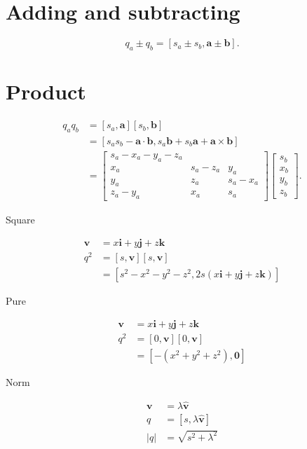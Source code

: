 \documentclass[10pt]{article}
\begin{document}
\section{Adding and subtracting}
$$
q_{a} \pm q_{b}=\left[s_{a} \pm s_{b}, \mathbf{a} \pm \mathbf{b}\right] .
$$

\section{Product}
$$
\begin{aligned}
q_{a} q_{b} & =\left[s_{a}, \mathbf{a}\right]\left[s_{b}, \mathbf{b}\right] \\
& =\left[s_{a} s_{b}-\mathbf{a} \cdot \mathbf{b}, s_{a} \mathbf{b}+s_{b} \mathbf{a}+\mathbf{a} \times \mathbf{b}\right] \\
& =\left[\begin{array}{rrr}
s_{a}-x_{a}-y_{a}-z_{a} \\
x_{a} & s_{a}-z_{a} & y_{a} \\
y_{a} & z_{a} & s_{a}-x_{a} \\
z_{a}-y_{a} & x_{a} & s_{a}
\end{array}\right]\left[\begin{array}{c}
s_{b} \\
x_{b} \\
y_{b} \\
z_{b}
\end{array}\right] .
\end{aligned}
$$

Square

$$
\begin{aligned}
\mathbf{v} & =x \mathbf{i}+y \mathbf{j}+z \mathbf{k} \\
q^{2} & =[s, \mathbf{v}][s, \mathbf{v}] \\
& =\left[s^{2}-x^{2}-y^{2}-z^{2}, 2 s(x \mathbf{i}+y \mathbf{j}+z \mathbf{k})\right]
\end{aligned}
$$

Pure

$$
\begin{aligned}
\mathbf{v} & =x \mathbf{i}+y \mathbf{j}+z \mathbf{k} \\
q^{2} & =[0, \mathbf{v}][0, \mathbf{v}] \\
& =\left[-\left(x^{2}+y^{2}+z^{2}\right), \mathbf{0}\right]
\end{aligned}
$$

Norm

$$
\begin{aligned}
\mathbf{v} & =\lambda \hat{\mathbf{v}} \\
q & =[s, \lambda \hat{\mathbf{v}}] \\
|q| & =\sqrt{s^{2}+\lambda^{2}}
\end{aligned}
$$
\end{document}
